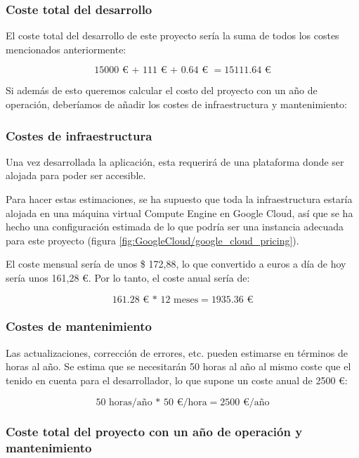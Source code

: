 \subsubsection{Coste total del desarrollo}

El coste total del desarrollo de este proyecto sería la suma de todos los costes mencionados anteriormente:

\[\num{15000} \text{ € + } \num{111} \text{ € + } \num{0,64} \text{ € } = \num{15111,64} \text{ €}\]

Si además de esto queremos calcular el costo del proyecto con un año de operación, deberíamos de añadir los costes de infraestructura y mantenimiento:

\subsubsection{Costes de infraestructura}

Una vez desarrollada la aplicación, esta requerirá de una plataforma donde ser alojada para poder ser accesible. 

Para hacer estas estimaciones, se ha supuesto que toda la infraestructura estaría alojada en una máquina virtual Compute Engine en Google Cloud, así que se ha hecho una configuración estimada de lo que podría ser una instancia adecuada para este proyecto (figura \ref{fig:GoogleCloud/google_cloud_pricing}). 

El coste mensual sería de unos \$ 172,88, lo que convertido a euros a día de hoy sería unos 161,28 €. Por lo tanto, el coste anual sería de:

\[\num{161,28} \text{ € * } 12 \text{ meses} = \num{1935,36} \text{ €}\]


\subsubsection{Costes de mantenimiento}

Las actualizaciones, corrección de errores, etc. pueden estimarse en términos de horas al año. Se estima que se necesitarán 50 horas al año al mismo coste que el tenido en cuenta para el desarrollador, lo que supone un coste anual de \num{2500} €:

\[50 \text{ horas/año * } 50 \text{ €/hora} = \num{2500} \text{ €/año}\]

\subsubsection{Coste total del proyecto con un año de operación y mantenimiento}

